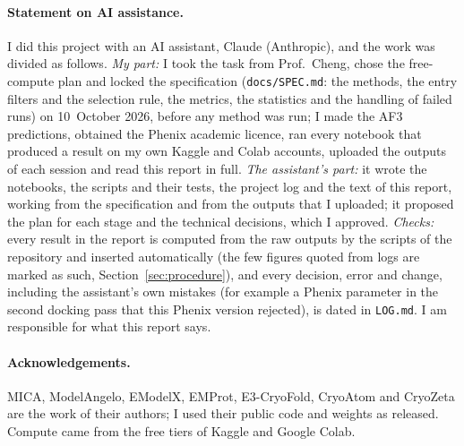 \paragraph{Statement on AI assistance.} I did this project with an AI assistant, Claude (Anthropic), and the work was divided as follows. \emph{My part:} I took the task from Prof.\ Cheng, chose the free-compute plan and locked the specification (\texttt{docs/SPEC.md}: the methods, the entry filters and the selection rule, the metrics, the statistics and the handling of failed runs) on 10~October 2026, before any method was run; I made the AF3 predictions, obtained the Phenix academic licence, ran every notebook that produced a result on my own Kaggle and Colab accounts, uploaded the outputs of each session and read this report in full. \emph{The assistant's part:} it wrote the notebooks, the scripts and their tests, the project log and the text of this report, working from the specification and from the outputs that I uploaded; it proposed the plan for each stage and the technical decisions, which I approved. \emph{Checks:} every result in the report is computed from the raw outputs by the scripts of the repository and inserted automatically (the few figures quoted from logs are marked as such, Section~\ref{sec:procedure}), and every decision, error and change, including the assistant's own mistakes (for example a Phenix parameter in the second docking pass that this Phenix version rejected), is dated in \texttt{LOG.md}. I am responsible for what this report says.
\paragraph{Acknowledgements.} MICA, ModelAngelo, EModelX, EMProt, E3-CryoFold, CryoAtom and CryoZeta are the work of their authors; I used their public code and weights as released. Compute came from the free tiers of Kaggle and Google Colab.
